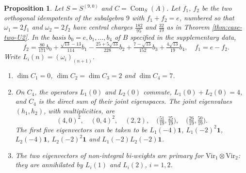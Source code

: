 \documentclass[leqno]{article}
\newcommand{\ot}{\otimes}
\newtheorem{prop}[thm]{Proposition}
\numberwithin{equation}{section}
\begin{document}
\begin{prop}
\label{prop:commutant-biweights}
Let $S = S^{(9,0)}$ and $C = \operatorname{Com}_S(A)$. Let $f_1$, $f_2$ be the two orthogonal idempotents of the subalgebra $9$ with $f_1+f_2 = e$, numbered so that $\omega_1 = 2f_1$ and $\omega_2 = 2f_2$ have central charges $\frac{182}{95}$ and $\frac{32}{19}$ as in Theorem \ref{thm:case-two-U2}. In the basis $b_0 = e, b_1, \ldots, b_4$ of $B$ specified in the supplementary data,
\[
f_2 = \tfrac{80}{171} b_0+\tfrac{\sqrt{13}-13}{114} b_1-\tfrac{25+5\sqrt{13}}{228} b_2+\tfrac{7-\sqrt{13}}{152} b_3+\tfrac{4\sqrt{13}}{19} b_4, \quad f_1 = e-f_2.
\]
Write $L_i(n) = (\omega_i)_{(n+1)}$.
\begin{enumerate}
\item $\dim C_1 = 0$, $\dim C_2 = \dim C_3 = 2$ and $\dim C_4 = 7$.
\item On $C_4$, the operators $L_1(0)$ and $L_2(0)$ commute, $L_1(0)+L_2(0) = 4$, and $C_4$ is the direct sum of their joint eigenspaces. The joint eigenvalues $(h_1,h_2)$, with multiplicities, are
\[
(4,0)^2, \quad (0,4)^2, \quad (2,2), \quad \big(\tfrac{51}{19},\tfrac{25}{19}\big), \quad \big(\tfrac{26}{19},\tfrac{50}{19}\big).
\]
The first five eigenvectors can be taken to be $L_1(-4)\mathbf 1$, $L_1(-2)^2\mathbf 1$, $L_2(-4)\mathbf 1$, $L_2(-2)^2\mathbf 1$ and $L_1(-2)L_2(-2)\mathbf 1$.
\item The two eigenvectors of non-integral bi-weights are primary for $\mathrm{Vir}_1 \ot \mathrm{Vir}_2$: they are annihilated by $L_i(1)$ and $L_i(2)$, $i = 1,2$.
\end{enumerate}
\end{prop}
\end{document}
